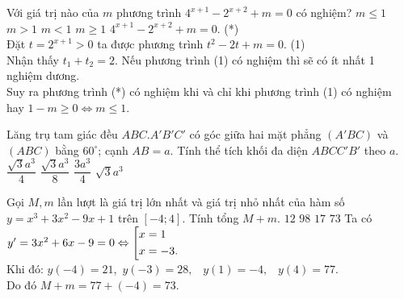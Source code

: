\begin{ex}%
Với giá trị nào của $ m $ phương trình $ 4^{x+1} -2^{x+2} + m = 0 $ có nghiệm?
\choice
{\True $ m \le 1 $}
{$ m>1 $}
{$ m<1 $}
{$ m \ge 1 $}
	\loigiai
	{ $ 4^{x+1} -2^{x+2} + m = 0. $ \quad (*)\\
Đặt $ t = 2^{x+1} > 0 $ ta được phương trình $ t^2 -2t+ m = 0. $ \quad (1)\\
Nhận thấy $ t_1 + t_2 = 2 $. Nếu phương trình (1) có nghiệm thì sẽ có ít nhất 1 nghiệm dương.\\
Suy ra phương trình (*) có nghiệm khi và chỉ khi phương trình (1) có nghiệm \\
hay $ 1 - m \ge 0 \Leftrightarrow m \le 1. $
	}
\end{ex}
\begin{ex}%
Lăng trụ tam giác đều $ ABC.A'B'C' $ có góc giữa hai mặt phẳng $ (A'BC) $ và $ (ABC) $ bằng $ 60^\circ $; cạnh $ AB = a. $ Tính thể tích khối đa diện $ ABCC'B' $ theo $ a. $
	\choice
	{\True $ \dfrac{\sqrt{3}a^3}{4} $}
	{$ \dfrac{\sqrt{3}a^3}{8} $}
	{ $ \dfrac{{3}a^3}{4} $}
	{$ \sqrt{3}a^3$}
	\loigiai
	{
{
}
	}
\end{ex}
\begin{ex}%
Gọi $ M, m $ lần lượt là giá trị lớn nhất và giá trị nhỏ nhất của hàm số $ y = x^3 + 3x^2 - 9x + 1 $ trên $ [-4;4] $. Tính tổng $ M + m. $
	\choice 
{$ 12 $}
{$ 98 $}
{$ 17 $}
{\True $ 73 $}
	\loigiai
	{
Ta có $ y' = 3x^2 + 6x - 9 = 0 \Leftrightarrow \left[\begin{aligned}&x = 1\\ &x = -3.\end{aligned}\right. $\\
Khi đó: $ y(-4) = 21 $,\, $ y(-3) = 28, $
	\, $ y(1) = -4, $
	\, $ y(4) = 77. $\\
Do đó $ M + m = 77 + (-4) = 73. $
	}
\end{ex}
